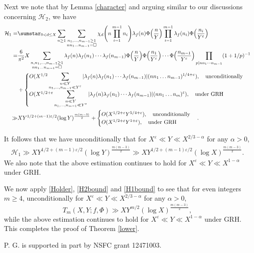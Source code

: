 \documentclass[twoside,leqno,10pt, A4]{amsart}
\begin{document}
  Next we note that by Lemma \ref{character} and arguing similar to our discussions concerning $\mathcal{H}_2$, we have
\begin{align*}
\mathcal{H}_1=&\sumstar_{0<d\leq X} \sum_{n\geq  1} \sum_{\substack{n_1,\ldots,n_{m-1}\geq 1 \\ nn_1\dots n_{m-1}=\square}} \chi_d\Bigg(n\prod_{i=1}^{m-1}n_i\Bigg) \lambda_f(n)\Phi\Big(\frac{n}{Y}\Big)\prod_{i=1}^{m-1}\lambda_f(n_i)\Phi\Big(\frac{n_i}{Y^{\varepsilon}}\Big) \\
= & \frac 6{\pi^2}X\sum_{\substack{n,n_1,\dots,n_{m-1} \geq 1\\ nn_1\dots n_{m-1}=\square}}\lambda_f(n)\lambda_f(n_1)\cdots \lambda_f(n_{m-1})\Phi\Big(\frac{n}{Y}\Big)\Phi\Big(\frac{n_1}{Y^{\varepsilon}}\Big)\cdots \Phi\Big(\frac{n_{m-1}}{Y^{\varepsilon}}\Big)\prod_{p|nn_1\cdots n_{m-1}}(1+1/p)^{-1}\\
& +
\begin{cases}
 O(X^{1/2}\displaystyle \sum_{\substack{n \ll Y \\ n_1,\dots,n_{m-1} \ll Y^{\varepsilon}}}|\lambda_f(n)\lambda_f(n_1)\cdots \lambda_f(n_{m-1})|(nn_1\dots n_{m-1})^{1/4+\varepsilon}), \quad
\text{unconditionally} \\
O(X^{1/2+\varepsilon}\displaystyle\sum_{\substack{n \ll Y \\ n_1,\dots,n_{m-1} \ll Y^{\varepsilon}}}|\lambda_f(n)\lambda_f(n_1)\cdots \lambda_f(n_{m-1})|(nn_1\dots n_m)^{\varepsilon}), \quad
\text{under GRH}
\end{cases} \\
\gg & XY^{1/2+(m-1)\varepsilon/2}(\log Y)^{\frac{m(m-3)}{2}} +
\begin{cases}
 O(X^{1/2+\varepsilon}Y^{5/4+\varepsilon}), \quad
\text{unconditionally} \\
O(X^{1/2+\varepsilon}Y^{1+\varepsilon}), \quad
\text{under GRH}
\end{cases}.
\end{align*}

  It follows that we have unconditionally that for $X^{\varepsilon} \ll Y\ll X^{2/3-\alpha}$ for any $\alpha>0$,
\begin{align}
\label{H1bound}
\mathcal{H}_1 \gg XY^{1/2+(m-1)\varepsilon/2}(\log Y)^{\frac{m(m-3)}{2}}\gg XY^{1/2+(m-1)\varepsilon/2}(\log X)^{\frac{m(m-3)}{2}}.
\end{align}
  We also note that the above estimation continues to hold for $X^{\varepsilon} \ll Y\ll X^{1-\alpha}$ under GRH.

 We now apply \eqref{Holder}, \eqref{H2bound} and \eqref{H1bound} to see that for even integers $m \geq 4$, unconditionally for $X^{\varepsilon} \ll Y\ll X^{2/3-\alpha}$ for any $\alpha>0$,
   $$T_m(X,Y;f,\Phi)  \gg XY^{m/2}(\log X)^{\frac{m(m-3)}{2}},$$
while the above estimation continues to hold for $X^{\varepsilon} \ll Y\ll X^{1-\alpha}$ under GRH. This completes the proof of Theorem \ref{lower}.




\vspace*{.5cm}

  P. G. is supported in part by NSFC grant 12471003.



\end{document}
